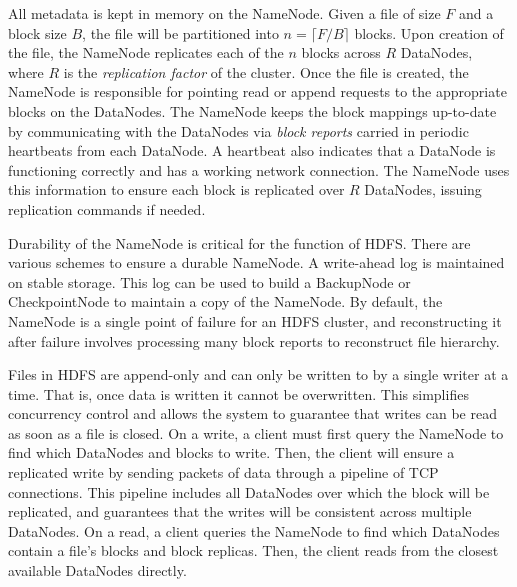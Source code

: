 \documentclass[11pt, a4paper]{article}
\begin{document}
\begin{multicols*}{2}
All metadata is kept in memory on the NameNode. Given a file of size $F$ and a block size $B$, the file will be partitioned into $n = \lceil F/B\rceil$ blocks. Upon creation of the file, the NameNode replicates each of the $n$ blocks across $R$ DataNodes, where $R$ is the \textit{replication factor} of the cluster. Once the file is created, the NameNode is responsible for pointing read or append requests to the appropriate blocks on the DataNodes. The NameNode keeps the block mappings up-to-date by communicating with the DataNodes via \textit{block reports} carried in periodic heartbeats from each DataNode. A heartbeat also indicates that a DataNode is functioning correctly and has a working network connection. The NameNode uses this information to ensure each block is replicated over $R$ DataNodes, issuing replication commands if needed.

Durability of the NameNode is critical for the function of HDFS. There are various schemes to ensure a durable NameNode. A write-ahead log is maintained on stable storage. This log can be used to build a BackupNode or CheckpointNode to maintain a copy of the NameNode. By default, the NameNode is a single point of failure for an HDFS cluster, and reconstructing it after failure involves processing many block reports to reconstruct file hierarchy.

Files in HDFS are append-only and can only be written to by a single writer at a time. That is, once data is written it cannot be overwritten. This simplifies concurrency control and allows the system to guarantee that writes can be read as soon as a file is closed. On a write, a client must first query the NameNode to find which DataNodes and blocks to write. Then, the client will ensure a replicated write by sending packets of data through a pipeline of TCP connections. This pipeline includes all DataNodes over which the block will be replicated, and guarantees that the writes will be consistent across multiple DataNodes. On a read, a client queries the NameNode to find which DataNodes contain a file's blocks and block replicas. Then, the client reads from the closest available DataNodes directly.


\end{multicols*}
\end{document}
